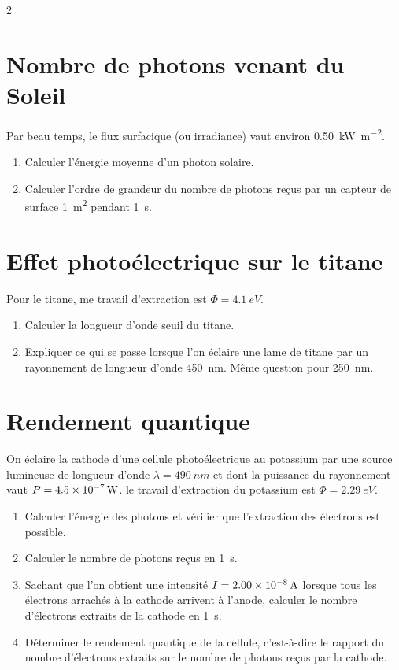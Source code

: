 \documentclass[a4paper,11pt,fleqn]{scrartcl}%
\begin{document}
\begin{multicols}{2}
\section{Nombre de photons venant du Soleil}
Par beau temps, le flux surfacique (ou irradiance) vaut environ \SI{0.50}{\kilo\watt\per\meter\squared}.
\begin{enumerate}
    \item Calculer l'énergie moyenne d'un photon solaire.
    \item Calculer l'ordre de grandeur du nombre de photons reçus par un capteur de surface \SI{1}{\meter\squared} pendant \SI{1}{s}.
\end{enumerate}

\section{Effet photoélectrique sur le titane}
Pour le titane, me travail d'extraction est $\Phi = \SI{4.1}{eV}$.
\begin{enumerate}
    \item Calculer la longueur d'onde seuil du titane.
    \item Expliquer ce qui se passe lorsque l'on éclaire une lame de titane par un rayonnement de longueur d'onde \SI{450}{nm}. Même question pour \SI{250}{nm}.
\end{enumerate}

\section{Rendement quantique}
On éclaire la cathode d'une cellule photoélectrique au potassium par une source lumineuse de longueur d'onde $\lambda=\SI{490}{nm}$ et dont la puissance du rayonnement vaut $P=\SI{4.5E-7}{W}$. le travail d'extraction du potassium est $\Phi=\SI{2.29}{eV}$.
\begin{enumerate}
    \item Calculer l'énergie des photons et vérifier que l'extraction des électrons est possible.
    \item Calculer le nombre de photons reçus en \SI{1}{s}.
    \item Sachant que l'on obtient une intensité $I= \SI{2,00E-8}{A}$ lorsque tous les électrons arrachés à la cathode arrivent à l'anode, calculer le nombre d'électrons extraits de la cathode en \SI{1}{s}.
    \item Déterminer le rendement quantique de la cellule, c'est-à-dire le rapport du nombre d'électrons extraits sur le nombre de photons reçus par la cathode.
\end{enumerate}
\end{multicols}
\end{document}
